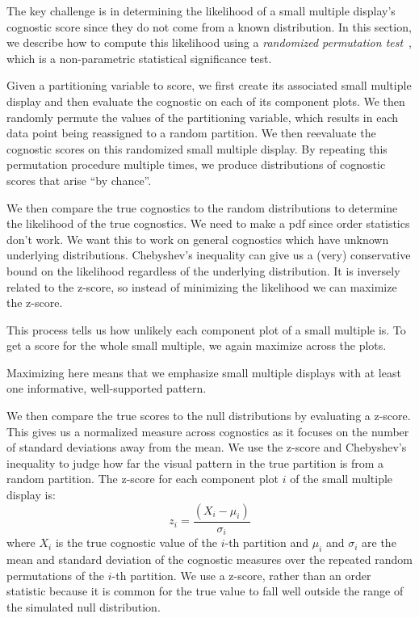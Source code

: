 The key challenge is in determining the likelihood of a small multiple display's cognostic score since they do not come from a known distribution. In this section, we describe how to compute this likelihood using a \emph{randomized permutation test}~\cite{Good2000}, which is a non-parametric statistical significance test.

Given a partitioning variable to score, we first create its associated small multiple display and then evaluate the cognostic on each of its component plots.
We then randomly permute the values of the partitioning variable, which results in each data point being reassigned to a random partition. We then reevaluate the cognostic scores on this randomized small multiple display. By repeating this permutation procedure multiple times, we produce distributions of cognostic scores that arise ``by chance''.

We then compare the true cognostics to the random distributions to determine the likelihood of the true cognostics. We need to make a pdf since order statistics don't work. We want this to work on general cognostics which have unknown underlying distributions. Chebyshev's inequality can give us a (very) conservative bound on the likelihood regardless of the underlying distribution. It is inversely related to the z-score, so instead of minimizing the likelihood we can maximize the z-score.

This process tells us how unlikely each component plot of a small multiple is. To get a score for the whole small multiple, we again maximize across the plots.

Maximizing here means that we emphasize small multiple displays with at least one informative, well-supported pattern.


We then compare the true scores to the null distributions by evaluating a z-score. This gives us a normalized measure across cognostics as it focuses on the number of standard deviations away from the mean. We use the z-score and Chebyshev's inequality to judge how far the visual pattern in the true partition is from a random partition. The z-score for each component plot $i$ of the small multiple display is:
$$z_i = \frac{(X_i-\mu_i)}{\sigma_i}$$ 
where $X_i$ is the true cognostic value of the $i$-th partition and $\mu_i$ and $\sigma_i$ are the mean and standard deviation of the cognostic measures over the repeated random permutations of the $i$-th partition. We use a z-score, rather than an order statistic because it is common for the true value to fall well outside the range of the simulated null distribution.

